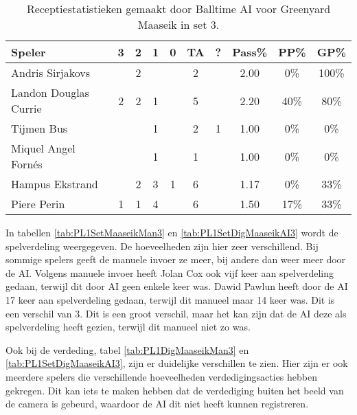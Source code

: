 \begin{table}[ht!]
  \centering
  \scriptsize
  \begin{tabular}{|l|c|c|c|c|c|c|c|c|c|} \hline
    \textbf{Speler} & 3 & 2 & 1 & 0 & TA & ? & Pass\% & PP\% & GP\% \\ \hline
    Andris Sirjakovs &  & 2 &  &  & 2 &  & 2.00 & 0\% & 100\% \\
    Landon Douglas Currie & 2 & 2 & 1 &  & 5 &  & 2.20 & 40\% & 80\% \\
    Tijmen Bus &  &  & 1 &  & 2 & 1 & 1.00 & 0\% & 0\% \\
    Miquel Angel Fornés &   &  & 1 &  & 1 &  & 1.00 & 0\% & 0\% \\
    Hampus Ekstrand &  & 2 & 3 & 1 & 6 &  & 1.17 & 0\% & 33\% \\
    Piere Perin & 1 & 1 & 4 &  & 6 &  & 1.50 & 17\% & 33\% \\ \hline
  \end{tabular}
  \caption[Receptiestatistieken gemaakt door Balltime AI voor Greenyard Maaseik in set 3]{\label{tab:PL1ReceiveMaaseikAI3}Receptiestatistieken gemaakt door Balltime AI voor Greenyard Maaseik in set 3.}
\end{table}

In tabellen \ref{tab:PL1SetMaaseikMan3} en \ref{tab:PL1SetDigMaaseikAI3} wordt de spelverdeling weergegeven. De hoeveelheden zijn hier zeer verschillend. Bij sommige spelers geeft de manuele invoer ze meer, bij andere dan weer meer door de AI. Volgens manuele invoer heeft Jolan Cox ook vijf keer aan spelverdeling gedaan, terwijl dit door AI geen enkele keer was. Dawid Pawlun heeft door de AI 17 keer aan spelverdeling gedaan, terwijl dit manueel maar 14 keer was. Dit is een verschil van 3. Dit is een groot verschil, maar het kan zijn dat de AI deze als spelverdeling heeft gezien, terwijl dit manueel niet zo was.

Ook bij de verdeding, tabel \ref{tab:PL1DigMaaseikMan3} en \ref{tab:PL1SetDigMaaseikAI3}, zijn er duidelijke verschillen te zien. Hier zijn er ook meerdere spelers die verschillende hoeveelheden verdedigingsacties hebben gekregen. Dit kan iets te maken hebben dat de verdediging buiten het beeld van de camera is gebeurd, waardoor de AI dit niet heeft kunnen registreren.

